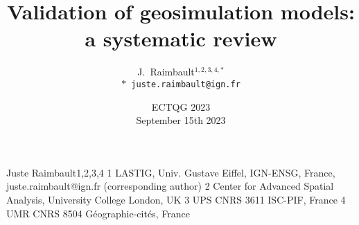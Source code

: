 \documentclass[english,11pt]{beamer}
\begin{document}
\title{Validation of geosimulation models: a systematic review}

\author{J.~Raimbault$^{1,2,3,4,\ast}$\\
\texttt{$\ast$ juste.raimbault@ign.fr}
}




\date{ECTQG 2023\\\smallskip
September 15th 2023
}

\frame{\maketitle}


 Juste Raimbault1,2,3,4
1 LASTIG, Univ. Gustave Eiffel, IGN-ENSG, France, juste.raimbault@ign.fr (corresponding author) 2 Center for Advanced Spatial Analysis, University College London, UK
3 UPS CNRS 3611 ISC-PIF, France
4 UMR CNRS 8504 Géographie-cités, France
\end{document}
